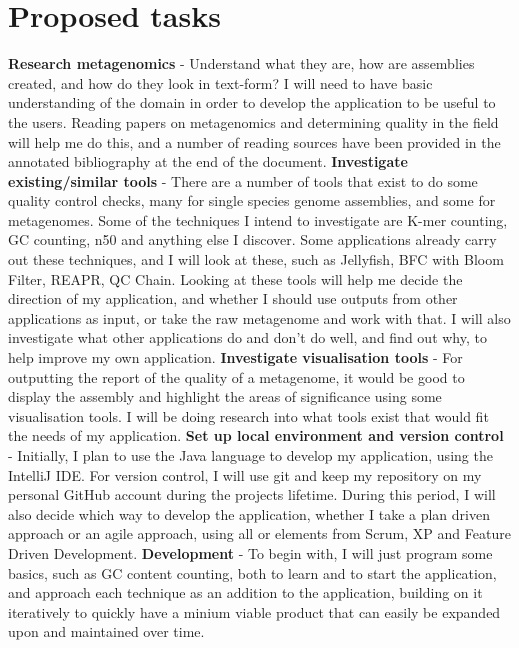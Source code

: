 \documentclass[11pt,fleqn,twoside]{article}
\begin{document}
\section{Proposed tasks}
\textbf{Research metagenomics} - Understand what they are, how are assemblies created, and how do they look in text-form? I will need to have basic understanding of the domain in order to develop the application to be useful to the users. Reading papers on metagenomics and determining quality in the field will help me do this, and a number of reading sources have been provided in the annotated bibliography at the end of the document.
\newline
\noindent
\textbf{Investigate existing/similar tools} - There are a number of tools that exist to do some quality control checks, many for single species genome assemblies, and some for metagenomes. Some of the techniques I intend to investigate are K-mer\cite{kmer} counting, GC counting\cite{gccount}, n50 and anything else I discover. Some applications already carry out these techniques, and I will look at these, such as Jellyfish\cite{jellyfish}, BFC\cite{bfc} with Bloom Filter, REAPR\cite{reapr}, QC Chain\cite{qcchain}. Looking at these tools will help me decide the direction of my application, and whether I should use outputs from other applications as input, or take the raw metagenome and work with that. I will also investigate what other applications do and don't do well, and find out why, to help improve my own application.
\newline
\noindent
\textbf{Investigate visualisation tools} - For outputting the report of the quality of a metagenome, it would be good to display the assembly and highlight the areas of significance using some visualisation tools. I will be doing research into what tools exist that would fit the needs of my application.
\newline
\noindent
\textbf{Set up local environment and version control} - Initially, I plan to use the Java language to develop my application, using the IntelliJ IDE. For version control, I will use git and keep my repository on my personal GitHub account during the projects lifetime. During this period, I will also decide which way to develop the application, whether I take a plan driven approach or an agile approach, using all or elements from Scrum, XP and Feature Driven Development.
\newline
\noindent
\textbf{Development} - To begin with, I will just program some basics, such as GC content counting, both to learn and to start the application, and approach each technique as an addition to the application, building on it iteratively to quickly have a minium viable product that can easily be expanded upon and maintained over time. 
\end{document}
